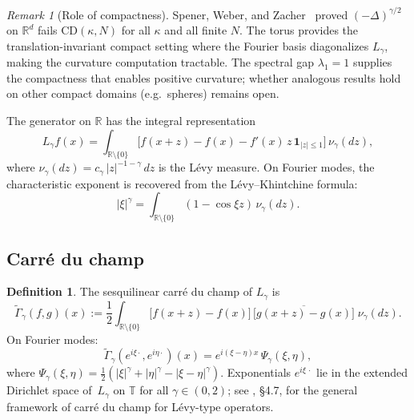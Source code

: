 \documentclass[11pt,a4paper]{article}
\theoremstyle{plain}
\theoremstyle{definition}
\newtheorem{definition}[theorem]{Definition}
\theoremstyle{remark}
\newtheorem{remark}[theorem]{Remark}
\newcommand{\R}{\mathbb{R}}
\newcommand{\T}{\mathbb{T}}
\begin{document}
\begin{remark}[Role of compactness]\label{rem:compact}
Spener, Weber, and Zacher~\cite{SpenerWeberZacher2020} proved
$(-\Delta)^{\gamma/2}$ on $\R^d$ fails $\mathrm{CD}(\kappa,N)$
for all $\kappa$ and all finite $N$. The torus provides the
translation-invariant compact setting where the Fourier basis
diagonalizes $L_\gamma$, making the curvature computation tractable.
The spectral gap $\lambda_1 = 1$ supplies the compactness that
enables positive curvature; whether analogous results hold on
other compact domains (e.g.\ spheres) remains open.
\end{remark}

The generator on $\R$ has the integral representation
\begin{equation}\label{eq:generator}
  L_\gamma f(x)
  = \int_{\R \setminus \{0\}}
  \bigl[f(x+z) - f(x) - f'(x)\,z\,\mathbf{1}_{|z| \leq 1}\bigr]
  \,\nu_\gamma(dz),
\end{equation}
where $\nu_\gamma(dz) = c_\gamma\,|z|^{-1-\gamma}\,dz$ is the
L\'evy measure.
On Fourier modes, the characteristic exponent is recovered from
the L\'evy--Khintchine formula:
\begin{equation}\label{eq:LK}
  |\xi|^\gamma
  = \int_{\R \setminus \{0\}}
  (1 - \cos \xi z)\,\nu_\gamma(dz).
\end{equation}


\subsection{Carr\'e du champ}

\begin{definition}\label{def:cdc}
The sesquilinear carr\'e du champ of $L_\gamma$ is
\begin{equation}\label{eq:cdc}
  \widetilde{\Gamma}_\gamma(f,g)(x)
  := \frac{1}{2} \int_{\R \setminus \{0\}}
  \bigl[f(x+z) - f(x)\bigr]\,
  \overline{\bigl[g(x+z) - g(x)\bigr]}\;
  \nu_\gamma(dz).
\end{equation}
On Fourier modes:
\begin{equation}\label{eq:psi-kernel}
  \widetilde{\Gamma}_\gamma(e^{i\xi\cdot}, e^{i\eta\cdot})(x)
  = e^{i(\xi-\eta)x}\,\Psi_\gamma(\xi,\eta),
\end{equation}
where $\Psi_\gamma(\xi,\eta)
= \tfrac{1}{2}(|\xi|^\gamma + |\eta|^\gamma - |\xi-\eta|^\gamma)$.
Exponentials $e^{i\xi\,\cdot}$ lie in the extended Dirichlet space
of~$L_\gamma$ on $\T$ for all $\gamma \in (0,2)$; see
\cite{BoettcherSchillingWang2013}, \S4.7, for the general framework
of carr\'e du champ for L\'evy-type operators.
\end{definition}
\end{document}
